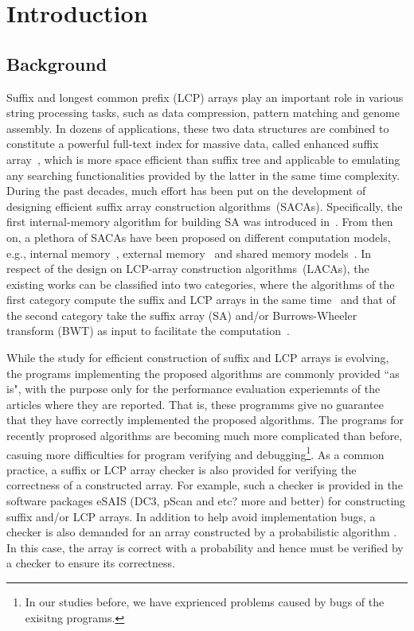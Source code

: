 \documentclass[10pt,journal,compsoc]{IEEEtran}
\begin{document}
\section{Introduction}\label{sec:introduction}

\subsection{Background} \label{sec:introduction:background}


Suffix and longest common prefix (LCP) arrays play an important role in various string processing tasks, such as data compression, pattern matching and genome assembly. In dozens of applications, these two data structures are combined to constitute a powerful full-text index for massive data, called enhanced suffix array~\cite{Abouelhodaa2004}, which is more space efficient than suffix tree and applicable to emulating any searching functionalities provided by the latter in the same time complexity. During the past decades, much effort has been put on the development of designing efficient suffix array construction algorithms~(SACAs). Specifically, the first internal-memory algorithm for building SA was introduced in~\cite{Manber1993}. From then on, a plethora of SACAs have been proposed on different computation models, e.g., internal memory~\cite{Karkkainen2003, Ko2003, Kim2003, Nong11}, external memory~\cite{Dementiev2008, Ferragina2012, Manzini2004, Bingmann12, Karkkainen2014, Nong14, Nong15} and shared memory models~\cite{Osipov2012, Deo2013, Wang2015, Karkkainen2015}. In respect of the design on LCP-array construction algorithms~(LACAs), the existing works can be classified into two categories, where the algorithms of the first category compute the suffix and LCP arrays in the same time~\cite{Fischer11, Bingmann12, Flick2015} and that of the second category take the suffix array (SA) and/or Burrows-Wheeler transform (BWT) as input to facilitate the computation~\cite{Kasai2001,Karkkainen2009, Fischer11, Puglisi2008, Puglisi2008, Deo2013, Karkkainen2016}.


While the study for efficient construction of suffix and LCP arrays is evolving, the programs implementing the proposed algorithms are commonly provided ``as is", with the purpose only for the performance evaluation experiemnts of the articles where they are reported. That is, these programms give no guarantee that they have correctly implemented the proposed algorithms. The programs for recently proprosed algorithms are becoming much more complicated than before, casuing more difficulties for program verifying and debugging\footnote{In our studies before, we have exprienced problems caused by bugs of the exisitng programs.}. As a common practice, a suffix or LCP array checker is also provided for verifying the correctness of a constructed array. For example, such a checker is provided in the software packages eSAIS \cite{xxx} (DC3, pScan and etc? more and better) for constructing suffix and/or LCP arrays. In addition to help avoid implementation bugs, a checker is also demanded for an array constructed by a probabilistic algorithm \cite{xxx}. In this case, the array is correct with a probability and hence must be verified by a checker to ensure its correctness.
\end{document}
